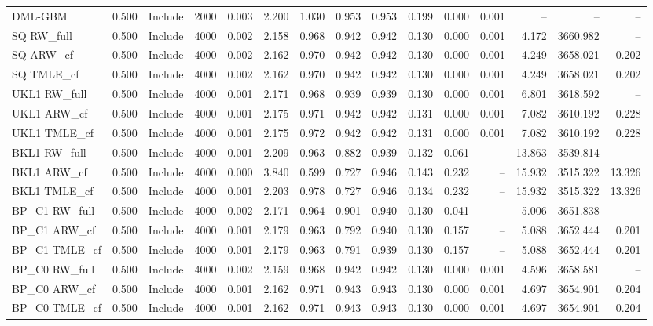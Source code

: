 \begin{tabular}{llllrrrrrrrrrrr}
DML-GBM & 0.500 & Include & 2000 & 0.003 & 2.200 & 1.030 & 0.953 & 0.953 & 0.199 & 0.000 & 0.001 & -- & -- & -- \\
SQ RW\_full & 0.500 & Include & 4000 & 0.002 & 2.158 & 0.968 & 0.942 & 0.942 & 0.130 & 0.000 & 0.001 & 4.172 & 3660.982 & -- \\
SQ ARW\_cf & 0.500 & Include & 4000 & 0.002 & 2.162 & 0.970 & 0.942 & 0.942 & 0.130 & 0.000 & 0.001 & 4.249 & 3658.021 & 0.202 \\
SQ TMLE\_cf & 0.500 & Include & 4000 & 0.002 & 2.162 & 0.970 & 0.942 & 0.942 & 0.130 & 0.000 & 0.001 & 4.249 & 3658.021 & 0.202 \\
UKL1 RW\_full & 0.500 & Include & 4000 & 0.001 & 2.171 & 0.968 & 0.939 & 0.939 & 0.130 & 0.000 & 0.001 & 6.801 & 3618.592 & -- \\
UKL1 ARW\_cf & 0.500 & Include & 4000 & 0.001 & 2.175 & 0.971 & 0.942 & 0.942 & 0.131 & 0.000 & 0.001 & 7.082 & 3610.192 & 0.228 \\
UKL1 TMLE\_cf & 0.500 & Include & 4000 & 0.001 & 2.175 & 0.972 & 0.942 & 0.942 & 0.131 & 0.000 & 0.001 & 7.082 & 3610.192 & 0.228 \\
BKL1 RW\_full & 0.500 & Include & 4000 & 0.001 & 2.209 & 0.963 & 0.882 & 0.939 & 0.132 & 0.061 & -- & 13.863 & 3539.814 & -- \\
BKL1 ARW\_cf & 0.500 & Include & 4000 & 0.000 & 3.840 & 0.599 & 0.727 & 0.946 & 0.143 & 0.232 & -- & 15.932 & 3515.322 & 13.326 \\
BKL1 TMLE\_cf & 0.500 & Include & 4000 & 0.001 & 2.203 & 0.978 & 0.727 & 0.946 & 0.134 & 0.232 & -- & 15.932 & 3515.322 & 13.326 \\
BP\_C1 RW\_full & 0.500 & Include & 4000 & 0.002 & 2.171 & 0.964 & 0.901 & 0.940 & 0.130 & 0.041 & -- & 5.006 & 3651.838 & -- \\
BP\_C1 ARW\_cf & 0.500 & Include & 4000 & 0.001 & 2.179 & 0.963 & 0.792 & 0.940 & 0.130 & 0.157 & -- & 5.088 & 3652.444 & 0.201 \\
BP\_C1 TMLE\_cf & 0.500 & Include & 4000 & 0.001 & 2.179 & 0.963 & 0.791 & 0.939 & 0.130 & 0.157 & -- & 5.088 & 3652.444 & 0.201 \\
BP\_C0 RW\_full & 0.500 & Include & 4000 & 0.002 & 2.159 & 0.968 & 0.942 & 0.942 & 0.130 & 0.000 & 0.001 & 4.596 & 3658.581 & -- \\
BP\_C0 ARW\_cf & 0.500 & Include & 4000 & 0.001 & 2.162 & 0.971 & 0.943 & 0.943 & 0.130 & 0.000 & 0.001 & 4.697 & 3654.901 & 0.204 \\
BP\_C0 TMLE\_cf & 0.500 & Include & 4000 & 0.001 & 2.162 & 0.971 & 0.943 & 0.943 & 0.130 & 0.000 & 0.001 & 4.697 & 3654.901 & 0.204 \\

\end{tabular}
